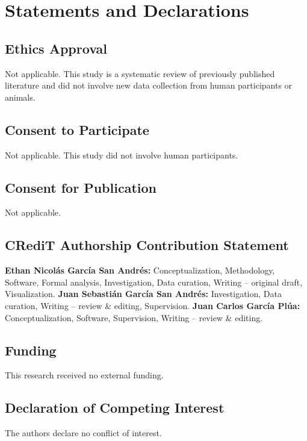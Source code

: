 \documentclass[5p,times,twocolumn]{elsarticle}
\begin{document}
\section*{Statements and Declarations}

\subsection*{Ethics Approval}

Not applicable. This study is a systematic review of previously published literature and did not involve new data collection from human participants or animals.

\subsection*{Consent to Participate}

Not applicable. This study did not involve human participants.

\subsection*{Consent for Publication}

Not applicable.

\subsection*{CRediT Authorship Contribution Statement}

\textbf{Ethan Nicolás García San Andrés:} Conceptualization, Methodology, Software, Formal analysis, Investigation, Data curation, Writing -- original draft, Visualization. \textbf{Juan Sebastián García San Andrés:} Investigation, Data curation, Writing -- review \& editing, Supervision. \textbf{Juan Carlos García Plúa:} Conceptualization, Software, Supervision, Writing -- review \& editing.

\subsection*{Funding}

This research received no external funding.

\subsection*{Declaration of Competing Interest}

The authors declare no conflict of interest.
\end{document}
